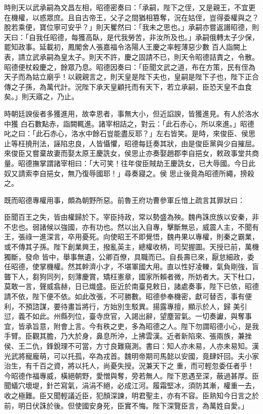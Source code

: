 \begin{pinyinscope}
 時則天以武承嗣為文昌左相，昭德密奏曰：「承嗣，陛下之侄，又是親王，不宜更在機權，以惑眾庶。且自古帝王，父子之間猶相篡奪，況在姑侄，豈得委權與之？脫若乘便，寶位寧可安乎？」則天矍然曰：「我未之思也。」承嗣亦嘗返譖昭德，則天曰：「自我任昭德，每獲高臥，是代我勞苦，非汝所及也。」承嗣俄轉太子少保，罷知政事。延載初，鳳閣舍人張嘉福令洛陽人王慶之率輕薄惡少數
 百人詣闕上表，請立武承嗣為皇太子。則天不許，慶之固請不已，則天令昭德詰責之，令散。昭德便杖殺慶之，餘眾乃息。昭德因奏曰：「臣聞文武之道，布在方策，民有侄為天子而為姑立廟乎！以親親言之，則天皇是陛下夫也，皇嗣是陛下子也，陛下正合傳之子孫，為萬代計。況陛下承天皇顧托而有天下，若立承嗣，臣恐天皇不血食矣。」則天寤之，乃止。



 時朝廷諛佞者多獲進用，故幸恩者，事無大小，但近諂諛，皆獲進見。有人於洛水中獲
 白石數點赤，詣闕輒進。諸宰相詰之，對云：「此石赤心，所以來進。」昭德叱之曰：「此石赤心，洛水中餘石豈能盡反耶？」左右皆笑。是時，來俊臣、侯思止等枉撓刑法，誣陷忠良，人皆懾懼，昭德每廷奏其狀，由是俊臣黨與少自摧屈。來俊臣又嘗棄故妻而娶太原王慶詵女，侯思止亦奏娶趙郡李自挹女，敕政事堂共商量。昭德撫掌謂諸宰相曰：「大可笑！往年俊臣賊劫王慶詵女，已大辱國。今日此奴又請索李自挹女，無乃復辱國耶！」尋奏寢之。侯
 思止後竟為昭德所繩，搒殺之。



 既而昭德專權用事，頗為朝野所惡。前魯王府功曹參軍丘愔上疏言其罪狀曰：



 臣聞百王之失，皆由權歸於下。宰臣持政，常以勢盛為殃。魏冉誅庶族以安秦，非不忠也。弱諸候以強國，亦有功也。然以出入自專，擊斷無忌，威震人主，不聞有王，張祿一進深言，卒用憂死。向使昭王不即覺悟，魏冉果以專權，則秦之霸業，或不傳其子孫。陛下創業興王，撥亂英主，總權收柄，司契握圖。天授已前，萬機獨斷，發命
 皆中，舉事無遺，公卿百僚，具職而已。自長壽已來，厭怠細政，委任昭德，使掌機權。然其幹濟小才，不堪軍國大用。直以性好凌轢，氣負剛強，盲聾下人，芻狗同列，刻薄慶賞，矯枉憲章，國家所賴者微，所妨者大。天下杜口，莫敢一言，聲威翕赫，日已熾盛。臣近於南臺見敕日，諸處奏事，陛下已依，昭德請不依，陛下便不依。如此改張，不可勝數。昭德參奉機密，獻可替否，事有便利，不預諮謀，要待畫旨將行，方始別生駁異。揚露專擅，顯示於人，歸
 美引愆，義不如此。州縣列位，臺寺庶官，入謁出辭，望塵習氣。一切奏讞，與奪事宜，皆承旨意，附會上言。今有秩之吏，多為昭德之人。陛下勿謂昭德小心，是我手臂。臣觀其膽，乃大於身，鼻息所沖，上拂雲漢。近者新陷來、張兩族，兼挫侯、王二仇，鋒銳理不可當，方寸良難窺測。書曰：知人亦未易，人亦未易知。漢光武將寵龐萌，可以托孤，卒為戎首。魏明帝期司馬懿以安國，竟肆奸回。夫小家治生，有千百之資，將以托人，尚憂失授。況兼天下之
 重，而可輕忽委任者乎！今昭德作福專威，橫絕朝野，愛憎與奪，旁若無人。陛下恩遇至深，蔽過甚厚。臣聞蟻穴壞堤，針芒寫氣，涓涓不絕，必成江河。履霜堅冰，須防其漸，權重一去，收之極難。臣又聞輕議近臣，犯顏深諫，明君聖主，亦有不容。臣熟知今日言之於前，明日伏誅於後。但使國安身死，臣實不悔。陛下深覽臣言，為萬姓自愛。」




\end{pinyinscope}
